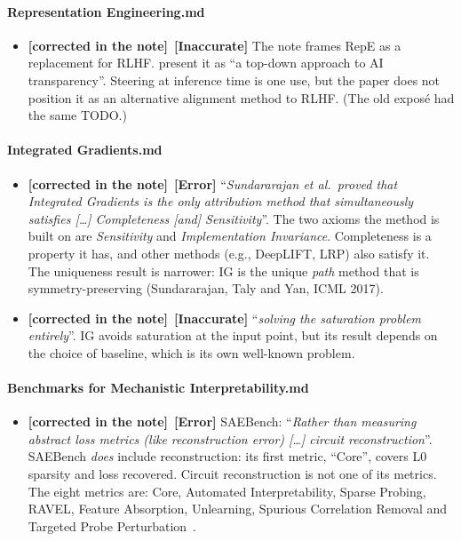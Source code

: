 \documentclass[11pt,a4paper]{article}
\newcommand{\note}[1]{\textsf{#1}}                 %
\newcommand{\sev}[1]{\textbf{[#1]}}                 %
\newcommand{\claim}[1]{\enquote{\textit{#1}}}       %
\newcommand{\fixed}{\textbf{\textcolor{green!50!black}{[corrected in the note]}}} %
\begin{document}
\paragraph{\note{Representation Engineering.md}}
\begin{itemize}
  \item \fixed\ \sev{Inaccurate} The note frames RepE as a replacement for RLHF.
    \textcite{zou2023representation} present it as \enquote{a top-down
    approach to AI transparency}. Steering at inference time is one use, but
    the paper does not position it as an alternative alignment method to
    RLHF. (The old exposé had the same TODO.)
\end{itemize}

\paragraph{\note{Integrated Gradients.md}}
\begin{itemize}
  \item \fixed\ \sev{Error} \claim{Sundararajan et al.\ proved that Integrated
    Gradients is the only attribution method that simultaneously satisfies
    [\dots] Completeness [and] Sensitivity}. The two axioms the method is
    built on are \emph{Sensitivity} and \emph{Implementation Invariance}.
    Completeness is a property it has, and other methods (e.g., DeepLIFT,
    LRP) also satisfy it. The uniqueness result is narrower: IG is the
    unique \emph{path} method that is symmetry-preserving (Sundararajan,
    Taly and Yan, ICML 2017).
  \item \fixed\ \sev{Inaccurate} \claim{solving the saturation problem entirely}.
    IG avoids saturation at the input point, but its result depends on the
    choice of baseline, which is its own well-known problem.
\end{itemize}

\paragraph{\note{Benchmarks for Mechanistic Interpretability.md}}
\begin{itemize}
  \item \fixed\ \sev{Error} SAEBench: \claim{Rather than measuring abstract loss
    metrics (like reconstruction error) [\dots] circuit reconstruction}.
    SAEBench \emph{does} include reconstruction: its first metric,
    \enquote{Core}, covers L0 sparsity and loss recovered. Circuit
    reconstruction is not one of its metrics. The eight metrics are: Core,
    Automated Interpretability, Sparse Probing, RAVEL, Feature Absorption,
    Unlearning, Spurious Correlation Removal and Targeted Probe
    Perturbation~\cite{karvonen2025saebench}.
\end{itemize}
\end{document}
